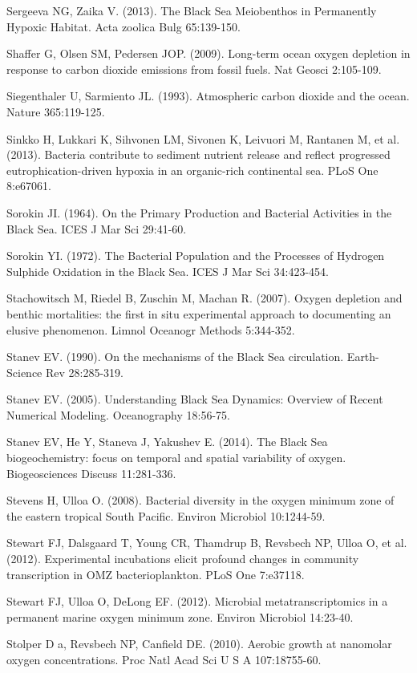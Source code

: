 Sergeeva NG, Zaika V. (2013). The Black Sea Meiobenthos in Permanently Hypoxic Habitat. Acta zoolica Bulg 65:139-150.

Shaffer G, Olsen SM, Pedersen JOP. (2009). Long-term ocean oxygen depletion in response to carbon dioxide emissions from fossil fuels. Nat Geosci 2:105-109.

Siegenthaler U, Sarmiento JL. (1993). Atmospheric carbon dioxide and the ocean. Nature 365:119-125.

Sinkko H, Lukkari K, Sihvonen LM, Sivonen K, Leivuori M, Rantanen M, et al. (2013). Bacteria contribute to sediment nutrient release and reflect progressed eutrophication-driven hypoxia in an organic-rich continental sea. PLoS One 8:e67061.

Sorokin JI. (1964). On the Primary Production and Bacterial Activities in the Black Sea. ICES J Mar Sci 29:41-60.

Sorokin YI. (1972). The Bacterial Population and the Processes of Hydrogen Sulphide Oxidation in the Black Sea. ICES J Mar Sci 34:423-454.

Stachowitsch M, Riedel B, Zuschin M, Machan R. (2007). Oxygen depletion and benthic mortalities: the first in situ experimental approach to documenting an elusive phenomenon. Limnol Oceanogr Methods 5:344-352.

Stanev EV. (1990). On the mechanisms of the Black Sea circulation. Earth-Science Rev 28:285-319.

Stanev EV. (2005). Understanding Black Sea Dynamics: Overview of Recent Numerical Modeling. Oceanography 18:56-75.

Stanev EV, He Y, Staneva J, Yakushev E. (2014). The Black Sea biogeochemistry: focus on temporal and spatial variability of oxygen. Biogeosciences Discuss 11:281-336.

Stevens H, Ulloa O. (2008). Bacterial diversity in the oxygen minimum zone of the eastern tropical South Pacific. Environ Microbiol 10:1244-59.

Stewart FJ, Dalsgaard T, Young CR, Thamdrup B, Revsbech NP, Ulloa O, et al. (2012). Experimental incubations elicit profound changes in community transcription in OMZ bacterioplankton. PLoS One 7:e37118.

Stewart FJ, Ulloa O, DeLong EF. (2012). Microbial metatranscriptomics in a permanent marine oxygen minimum zone. Environ Microbiol 14:23-40.

Stolper D a, Revsbech NP, Canfield DE. (2010). Aerobic growth at nanomolar oxygen concentrations. Proc Natl Acad Sci U S A 107:18755-60.

